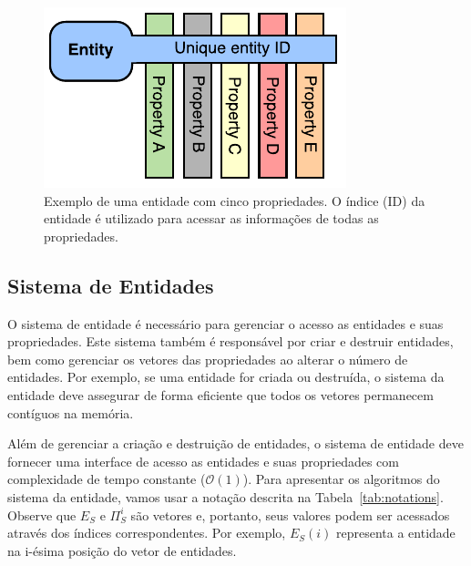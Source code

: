 \begin{figure}[ht]
    \centering
    \includegraphics[width=0.5\linewidth]{img/tecnica/entity}
    \caption[Exemplo de uma entidade]{Exemplo de uma entidade com cinco propriedades. O índice (ID) da entidade é utilizado para acessar as informações de todas as propriedades.}
    \label{fig:entity_example}
\end{figure}

\subsection{Sistema de Entidades}

O sistema de entidade é necessário para gerenciar o acesso as entidades e suas propriedades. Este sistema também é responsável por criar e destruir entidades, bem como gerenciar os vetores das propriedades ao alterar o número de entidades. Por exemplo, se uma entidade for criada ou destruída, o sistema da entidade deve assegurar de forma eficiente que todos os vetores permanecem contíguos na memória.

Além de gerenciar a criação e destruição de entidades, o sistema de entidade deve fornecer uma interface de acesso as entidades e suas propriedades com complexidade de tempo constante  ($\mathcal{O}(1)$). Para apresentar os algoritmos do sistema da entidade, vamos usar a notação descrita na Tabela~\ref{tab:notations}. Observe que $E_S$ e $\Pi^i_S$ são vetores e, portanto, seus valores podem ser acessados através dos índices correspondentes. Por exemplo, $E_S(i)$ representa a entidade na i-ésima posição do vetor de entidades.

